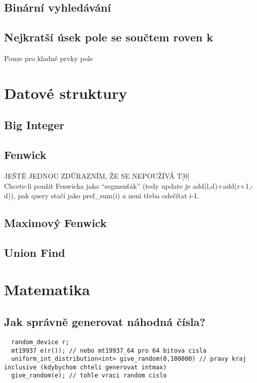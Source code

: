 \documentclass[10pt, a4paper]{article}
\begin{document}
\subsection{Binární vyhledávání}


\subsection{Nejkratší úsek pole se součtem roven k}
Pouze pro kladné prvky pole


\newpage

\section{Datové struktury}

\subsection{Big Integer}


\subsection{Fenwick}
JEŠTĚ JEDNOU ZDŮRAZNÍM, ŽE SE NEPOUŽÍVÁ T[0]\\
Chcete-li použít Fenwicka jako ``segmenťák'' (tedy update je add(l,d)+add(r+1,-d)), pak query stačí jako pref\_sum(i) a není třeba odečítat i-1.


\subsection{Maximový Fenwick}


\subsection{Union Find}


\newpage

\section{Matematika}

\subsection{Jak správně generovat náhodná čísla?}
\begin{lstlisting}
  random_device r;
  mt19937 e(r()); // nebo mt19937_64 pro 64 bitova cisla
  uniform_int_distribution<int> give_random(0,100000) // pravy kraj inclusive (kdybychom chteli generovat intmax)
  give_random(e); // tohle vraci random cislo
\end{lstlisting}
\end{document}
